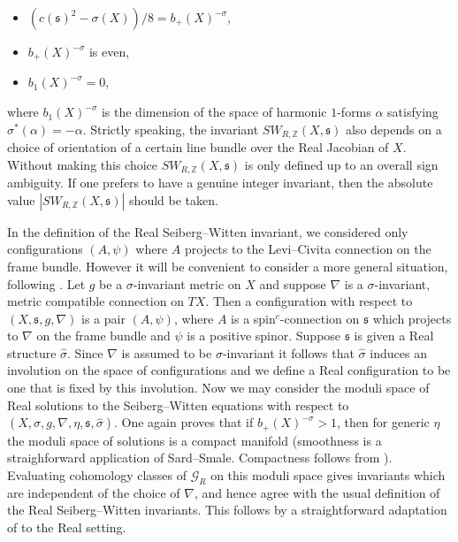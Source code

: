 \documentclass{amsart}
\theoremstyle{definition}
\theoremstyle{remark}
\numberwithin{equation}{section}
\begin{document}
\begin{itemize}
\item[(1)]{$(c(\mathfrak{s})^2 - \sigma(X))/8 = b_+(X)^{-\sigma}$,}
\item[(2)]{$b_+(X)^{-\sigma}$ is even,}
\item[(3)]{$b_1(X)^{-\sigma} = 0$,}
\end{itemize}
where $b_1(X)^{-\sigma}$ is the dimension of the space of harmonic $1$-forms $\alpha$ satisfying $\sigma^*(\alpha) = -\alpha$. Strictly speaking, the invariant $SW_{R,\mathbb{Z}}(X , \mathfrak{s})$ also depends on a choice of orientation of a certain line bundle over the Real Jacobian of $X$. Without making this choice $SW_{R,\mathbb{Z}}(X,\mathfrak{s})$ is only defined up to an overall sign ambiguity. If one prefers to have a genuine integer invariant, then the absolute value $| SW_{R,\mathbb{Z}}(X , \mathfrak{s})|$ should be taken.

In the definition of the Real Seiberg--Witten invariant, we considered only configurations $(A , \psi)$ where $A$ projects to the Levi--Civita connection on the frame bundle. However it will be convenient to consider a more general situation, following \cite{moy,os}. Let $g$ be a $\sigma$-invariant metric on $X$ and suppose $\nabla$ is a $\sigma$-invariant, metric compatible connection on $TX$. Then a configuration with respect to $(X , \mathfrak{s} , g , \nabla)$ is a pair $(A , \psi)$, where $A$ is a spin$^c$-connection on $\mathfrak{s}$ which projects to $\nabla$ on the frame bundle and $\psi$ is a positive spinor. Suppose $\mathfrak{s}$ is given a Real structure $\widehat{\sigma}$. Since $\nabla$ is assumed to be $\sigma$-invariant it follows that $\widehat{\sigma}$ induces an involution on the space of configurations and we define a Real configuration to be one that is fixed by this involution. Now we may consider the moduli space of Real solutions to the Seiberg--Witten equations with respect to $(X , \sigma , g , \nabla , \eta , \mathfrak{s} , \widehat{\sigma})$. One again proves that if $b_+(X)^{-\sigma} > 1$, then for generic $\eta$ the moduli space of solutions is a compact manifold (smoothness is a straighforward application of Sard--Smale. Compactness follows from \cite[]{os}). Evaluating cohomology classes of $\mathcal{G}_R$ on this moduli space gives invariants which are independent of the choice of $\nabla$, and hence agree with the usual definition of the Real Seiberg--Witten invariants. This follows by a straightforward adaptation of \cite[Theorem 4.6]{os} to the Real setting.
\end{document}
